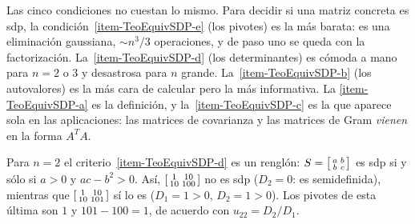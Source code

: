 \begin{remark}\label{obs:cual-usar}
Las cinco condiciones no cuestan lo mismo. Para decidir si una matriz concreta
es sdp, la condición~\ref{item-TeoEquivSDP-e} (los pivotes) es la más barata:
es una eliminación gaussiana, $\sim n^3/3$ operaciones, y de paso uno se queda
con la factorización. La~\ref{item-TeoEquivSDP-d} (los determinantes) es cómoda
a mano para $n=2$ o $3$ y desastrosa para $n$ grande. La~\ref{item-TeoEquivSDP-b}
(los autovalores) es la más cara de calcular pero la más informativa. La
\ref{item-TeoEquivSDP-a} es la definición, y la~\ref{item-TeoEquivSDP-c} es la
que aparece sola en las aplicaciones: las matrices de covarianza y las matrices
de Gram \emph{vienen} en la forma $A^TA$.
\end{remark}

\begin{example}\label{ej:sdp-2x2}
Para $n=2$ el criterio~\ref{item-TeoEquivSDP-d} es un renglón: $S =
\begin{bsmallmatrix} a & b\\ b & c\end{bsmallmatrix}$ es sdp si y sólo si
$a>0$ y $ac-b^2>0$. Así, $\begin{bsmallmatrix} 1 & 10\\ 10 &
100\end{bsmallmatrix}$ no es sdp ($D_2=0$: es semidefinida), mientras que
$\begin{bsmallmatrix} 1 & 10\\ 10 & 101\end{bsmallmatrix}$ sí lo es
($D_1=1>0$, $D_2=1>0$). Los pivotes de esta última son $1$ y
$101-100=1$, de acuerdo con $u_{22}=D_2/D_1$.
\end{example}

